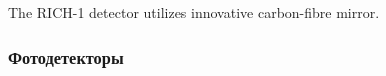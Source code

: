 The \mbox{RICH-1} detector utilizes innovative carbon-fibre mirror. \todo




\todo



\subsubsection{Фотодетекторы}

